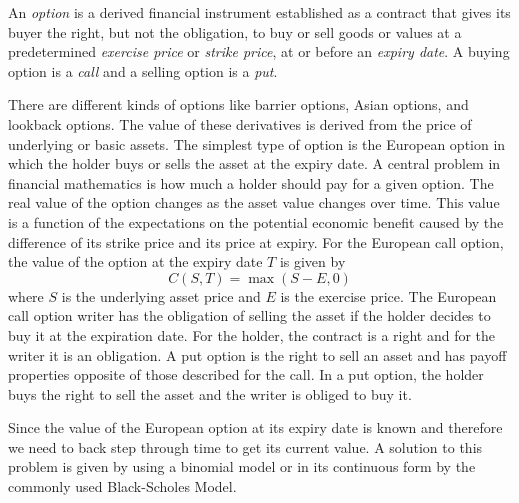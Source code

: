 \documentclass[00main.tex]{subfiles}
\begin{document}
\begin{defi}
An \emph{option} is a derived financial instrument established as a contract that gives its buyer the right, but not the obligation, to buy or sell goods or values at a predetermined \emph{exercise price} or \emph{strike price}, at or before an \emph{expiry date}. A buying option is a \emph{call} and a selling option is a \emph{put}.
\end{defi}



There are different kinds of options like barrier options, Asian options, and lookback options. The value of these derivatives is derived from the price of underlying or basic assets. The simplest type of option is the European option in which the holder buys or sells the asset at the expiry date. A central problem in financial mathematics is how much a holder should pay for a given option. The real value of the option changes as the asset value changes over time. This value is a function of the expectations on the potential economic benefit caused by the difference of its strike price and its price at expiry. For the European call option, the value of the option at the expiry date $T$ is given by \[ C(S,T) = \max (S-E,0) \] where $S$ is the underlying asset price and $E$ is the exercise price. The European call option writer has the obligation of selling the asset if the holder decides to buy it at the expiration date. For the holder, the contract is a right and for the writer it is an obligation. A put option is the right to sell an asset and has payoff properties opposite of those described for the call. In a put option, the holder buys the right to sell the asset and the writer is obliged to buy it.


Since the value of the European option at its expiry date is known and therefore we need to back step through time to get its current value. A solution to this problem is given by using a binomial model or in its continuous form by the commonly used Black-Scholes Model. 


\end{document}
